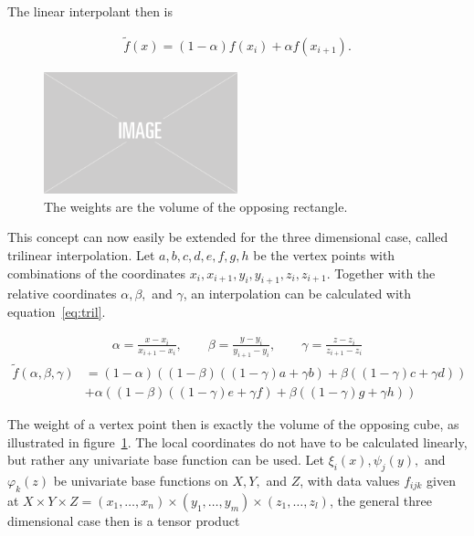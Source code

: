 The linear interpolant then is

\begin{align}
\widetilde{f}(x) = (1-\alpha)f(x_i) + \alpha f(x_{i+1}).
\end{align}

\begin{figure}
    \centering
    \includegraphics[width=0.5\textwidth]{figures/img-placeholder.png}
    \caption{The weights are the volume of the opposing rectangle.}
    \label{fig:bilinear}
\end{figure}

This concept can now easily be extended for the three dimensional case, called trilinear interpolation. Let $a,b,c,d,e,f,g,h$ be the vertex points with combinations of the coordinates $x_i, x_{i+1}, y_i, y_{i+1}, z_i, z_{i+1}$. Together with the relative coordinates $\alpha, \beta,$ and $\gamma$, an interpolation can be calculated with equation~\ref{eq:tril}.

\begin{align}
    \alpha = \frac{x-x_i}{x_{i+1}-x_i}, \qquad \beta = \frac{y-y_i}{y_{i+1}-y_i}, \qquad \gamma = \frac{z-z_i}{z_{i+1}-z_i}
\end{align}
\begin{align}\label{eq:tril}
\widetilde{f}(\alpha, \beta, \gamma) &= (1-\alpha) ((1-\beta)((1-\gamma)a + \gamma b) + \beta ((1-\gamma) c + \gamma d)) \\
                         &+ \alpha ((1-\beta)((1-\gamma)e + \gamma f) + \beta ((1-\gamma) g + \gamma h))
\end{align}

The weight of a vertex point then is exactly the volume of the opposing cube, as illustrated in figure~\ref{fig:bilinear}. The local coordinates do not have to be calculated linearly, but rather any univariate base function can be used. Let $\xi_i(x), \psi_j(y),$ and $\varphi_k(z)$ be univariate base functions on $X, Y, $ and $Z$, with data values $f_{ijk}$ given at $X \times Y \times Z = (x_1,\dots,x_n) \times (y_1,\dots,y_m) \times (z_1, \dots, z_l)$, the general three dimensional case then is a tensor product

